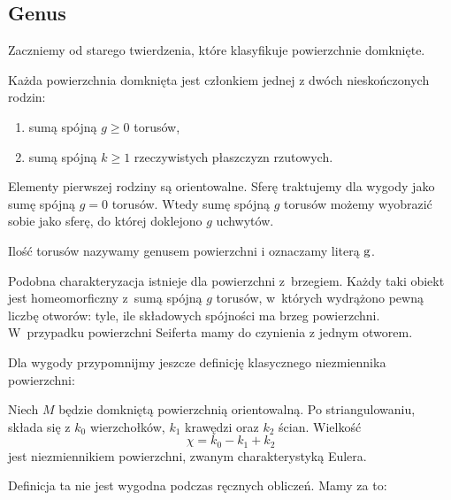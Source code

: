 \subsection{Genus}
%
\label{sec:genus}%
Zaczniemy od starego twierdzenia, które klasyfikuje powierzchnie domknięte.

\begin{proposition}
    Każda powierzchnia domknięta jest członkiem jednej z dwóch nieskończonych rodzin:
    \begin{enumerate}[leftmargin=*]
        \itemsep0em
        \item sumą spójną $g \ge 0$ torusów,
        \item sumą spójną $k \ge 1$ rzeczywistych płaszczyzn rzutowych.
    \end{enumerate}
\end{proposition}

Elementy pierwszej rodziny są orientowalne.
Sferę traktujemy dla wygody jako sumę spójną $g = 0$ torusów.
Wtedy sumę spójną $g$ torusów możemy wyobrazić sobie jako sferę, do której doklejono $g$ uchwytów.

\begin{definition}
    Ilość torusów nazywamy genusem powierzchni i oznaczamy literą $\operatorname{g}$.
\end{definition}

Podobna charakteryzacja istnieje dla powierzchni z~brzegiem.
Każdy taki obiekt jest homeomorficzny z~sumą spójną $g$ torusów, w~których wydrążono pewną liczbę otworów: tyle, ile składowych spójności ma brzeg powierzchni.
W~przypadku powierzchni Seiferta mamy do czynienia z jednym otworem.

Dla wygody przypomnijmy jeszcze definicję klasycznego niezmiennika powierzchni:

\begin{definition}
%
    Niech $M$ będzie domkniętą powierzchnią orientowalną.
    Po striangulowaniu, składa się z $k_0$ wierzchołków, $k_1$ krawędzi oraz $k_2$ ścian.
    Wielkość
    \begin{equation}
        \chi = k_0 - k_1 + k_2
    \end{equation}
    jest niezmiennikiem powierzchni, zwanym charakterystyką Eulera.
\end{definition}

Definicja ta nie jest wygodna podczas ręcznych obliczeń.
Mamy za to:

